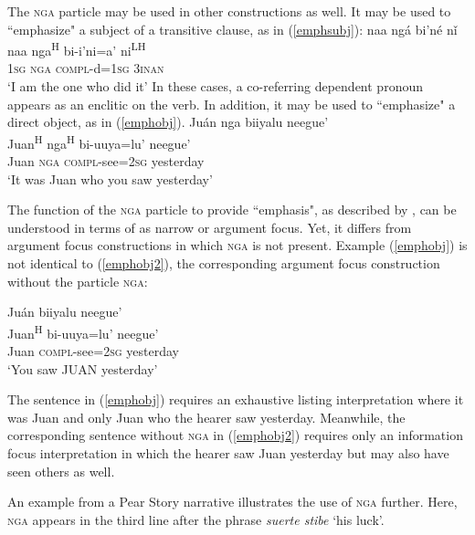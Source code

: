 The \textsc{nga} particle may be used in other constructions as well. It may be used to ``emphasize" a subject of a transitive clause, as in (\ref{emphsubj}):
\ea\label{emphsubj}
\glll naa ng\'{a} bi'n\'{e} n\v{i} \\
naa nga\textsuperscript{H} bi-i'ni=a' ni\textsuperscript{LH} \\
1\textsc{sg} \textsc{nga} \textsc{compl}-d=1\textsc{sg} 3\textsc{inan} \\
\glt `I am the one who did it' \hfill \citep[98]{pickett1998}
\z
In these cases, a co-referring dependent pronoun appears as an enclitic on the verb. In addition, it may  be used to ``emphasize" a direct object, as in (\ref{emphobj}).
\ea\label{emphobj} 
\glll Ju\'{a}n nga biiyalu neegue' \\
Juan\textsuperscript{H} nga\textsuperscript{H} bi-uuya=lu' neegue' \\
Juan \textsc{nga} \textsc{compl}-see=2\textsc{sg} yesterday \\
\glt `It was Juan who you saw yesterday' \hfill \citep[98]{pickett1998}

\z
The function of the \textsc{nga} particle to provide ``emphasis", as described by \citet{pickett1998}, can be understood in terms of \citet{lambrecht1994} as narrow or argument focus. Yet, it differs from argument focus constructions in which \textsc{nga} is not present. Example (\ref{emphobj}) is not identical to (\ref{emphobj2}), the corresponding argument focus construction without the particle \textsc{nga}:

\ea\label{emphobj2}
\glll Ju\'{a}n biiyalu neegue' \\
Juan\textsuperscript{H} bi-uuya=lu' neegue' \\
Juan \textsc{compl}-see=2\textsc{sg} yesterday \\
\glt `You saw JUAN yesterday'

\z
The sentence in (\ref{emphobj}) requires an exhaustive listing interpretation where it was Juan and only Juan who the hearer saw yesterday. Meanwhile, the corresponding sentence without \textsc{nga} in (\ref{emphobj2}) requires only an information focus interpretation in which the hearer saw Juan yesterday but may also have seen others as well.


An example from a Pear Story narrative illustrates the use of \textsc{nga} further. Here, \textsc{nga} appears in the third line after the phrase \textit{suerte stibe} `his luck'.

